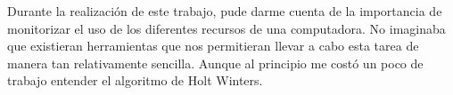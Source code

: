 Durante la realización de este trabajo, pude darme cuenta de la importancia de monitorizar el uso de los diferentes recursos de una computadora. No imaginaba que existieran herramientas que nos permitieran llevar a cabo esta tarea de manera tan relativamente sencilla. Aunque al principio me costó un poco de trabajo entender el algoritmo de Holt Winters.
